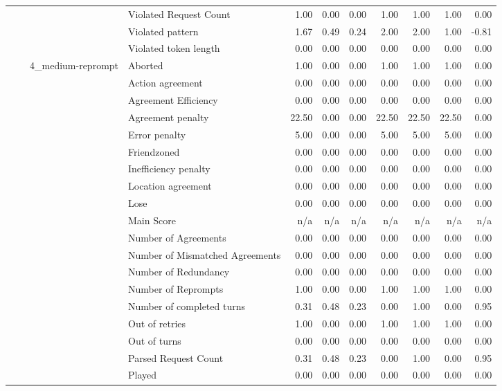 \begin{tabular}{llllrrrrrrr}
 &  &  & Violated Request Count & 1.00 & 0.00 & 0.00 & 1.00 & 1.00 & 1.00 & 0.00 \\
 &  &  & Violated pattern & 1.67 & 0.49 & 0.24 & 2.00 & 2.00 & 1.00 & -0.81 \\
 &  &  & Violated token length & 0.00 & 0.00 & 0.00 & 0.00 & 0.00 & 0.00 & 0.00 \\
\cline{3-11}
 &  & \multirow[t]{27}{*}{4_medium-reprompt} & Aborted & 1.00 & 0.00 & 0.00 & 1.00 & 1.00 & 1.00 & 0.00 \\
 &  &  & Action agreement & 0.00 & 0.00 & 0.00 & 0.00 & 0.00 & 0.00 & 0.00 \\
 &  &  & Agreement Efficiency & 0.00 & 0.00 & 0.00 & 0.00 & 0.00 & 0.00 & 0.00 \\
 &  &  & Agreement penalty & 22.50 & 0.00 & 0.00 & 22.50 & 22.50 & 22.50 & 0.00 \\
 &  &  & Error penalty & 5.00 & 0.00 & 0.00 & 5.00 & 5.00 & 5.00 & 0.00 \\
 &  &  & Friendzoned & 0.00 & 0.00 & 0.00 & 0.00 & 0.00 & 0.00 & 0.00 \\
 &  &  & Inefficiency penalty & 0.00 & 0.00 & 0.00 & 0.00 & 0.00 & 0.00 & 0.00 \\
 &  &  & Location agreement & 0.00 & 0.00 & 0.00 & 0.00 & 0.00 & 0.00 & 0.00 \\
 &  &  & Lose & 0.00 & 0.00 & 0.00 & 0.00 & 0.00 & 0.00 & 0.00 \\
 &  &  & Main Score & n/a & n/a & n/a & n/a & n/a & n/a & n/a \\
 &  &  & Number of Agreements & 0.00 & 0.00 & 0.00 & 0.00 & 0.00 & 0.00 & 0.00 \\
 &  &  & Number of Mismatched Agreements & 0.00 & 0.00 & 0.00 & 0.00 & 0.00 & 0.00 & 0.00 \\
 &  &  & Number of Redundancy & 0.00 & 0.00 & 0.00 & 0.00 & 0.00 & 0.00 & 0.00 \\
 &  &  & Number of Reprompts & 1.00 & 0.00 & 0.00 & 1.00 & 1.00 & 1.00 & 0.00 \\
 &  &  & Number of completed turns & 0.31 & 0.48 & 0.23 & 0.00 & 1.00 & 0.00 & 0.95 \\
 &  &  & Out of retries & 1.00 & 0.00 & 0.00 & 1.00 & 1.00 & 1.00 & 0.00 \\
 &  &  & Out of turns & 0.00 & 0.00 & 0.00 & 0.00 & 0.00 & 0.00 & 0.00 \\
 &  &  & Parsed Request Count & 0.31 & 0.48 & 0.23 & 0.00 & 1.00 & 0.00 & 0.95 \\
 &  &  & Played & 0.00 & 0.00 & 0.00 & 0.00 & 0.00 & 0.00 & 0.00 \\

\end{tabular}
